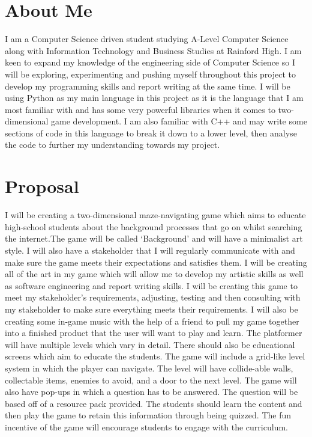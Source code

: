 \documentclass[12pt]{report}
\begin{document}
\section{About Me}
I am a Computer Science driven student studying A-Level Computer Science along with Information Technology and Business Studies at Rainford High. I am keen to expand my knowledge of the engineering side of Computer Science so I will be exploring, experimenting and pushing myself throughout this project to develop my programming skills and report writing at the same time. I will be using Python as my main language in this project as it is the language that I am most familiar with and has some very powerful libraries when it comes to two-dimensional game development. I am also familiar with C++ and may write some sections of code in this language to break it down to a lower level, then analyse the code to further my understanding towards my project. 

\pagebreak

\section{Proposal}
I will be creating a two-dimensional maze-navigating game which aims to educate high-school students about the background processes that go on whilst searching the internet.The game will be called ‘Background’ and will have a minimalist art style. I will also have a stakeholder that I will regularly communicate with and make sure the game meets their expectations and satisfies them. I will be creating all of the art in my game which will allow me to develop my artistic skills as well as software engineering and report writing skills. I will be creating this game to meet my stakeholder’s requirements, adjusting, testing and then consulting with my stakeholder to make sure everything meets their requirements. I will also be creating some in-game music with the help of a friend to pull my game together into a finished product that the user will want to play and learn. The platformer will have multiple levels which vary in detail. There should also be educational screens which aim to educate the students. The game will include a grid-like level system in which the player can navigate. The level will have collide-able walls, collectable items, enemies to avoid, and a door to the next level. The game will also have pop-ups in which a question has to be answered. The question will be based off of a resource pack provided. The students should learn the content and then play the game to retain this information through being quizzed. The fun incentive of the game will encourage students to engage with the curriculum. 
\end{document}
